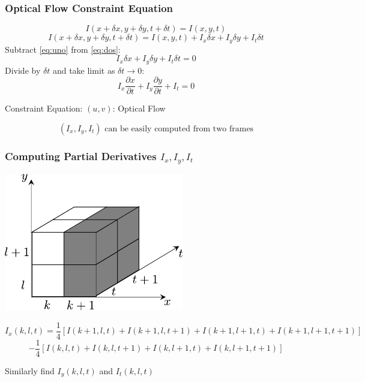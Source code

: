 \begin{frame}
  \frametitle{Optical Flow Constraint Equation}

  \begin{equation}\label{eq:uno}
    I(x + \delta x, y + \delta y, t + \delta t) = I(x, y, t)
  \end{equation}
  \begin{equation}\label{eq:dos}
    I(x + \delta x, y + \delta y, t + \delta t) = I(x, y, t) + I_x \delta x + I_y \delta y + I_t \delta t
  \end{equation}
  Subtract \eqref{eq:uno} from \eqref{eq:dos}: \quad 
  \[
  I_x \delta x + I_y \delta y + I_t \delta t = 0
  \]
  Divide by $\delta t$ and take limit as $\delta t \rightarrow 0$: \quad 
  \[
  I_x \frac{\partial x}{\partial t} + I_y \frac{\partial y}{\partial t} + I_t = 0
  \]

  Constraint Equation: \quad {} \quad $(u,v)$: Optical Flow

  \[
  (I_x, I_y, I_t) \text{ can be easily computed from two frames}
  \]

\end{frame}

\begin{frame}
  \frametitle{Computing Partial Derivatives $I_x, I_y, I_t$}

  \begin{center}
    \includegraphics[width=0.35\columnwidth]{./images/optical_flow/computing_partial_derivatives.pdf}
  \end{center}
  \[
  I_x(k, l, t) = \frac{1}{4} [I(k+1,l,t) + I(k+1,l,t+1) + I(k+1,l+1,t) + I(k+1,l+1,t+1)]
  \]
  \[
  - \frac{1}{4}[I(k,l,t) + I(k,l,t+1) + I(k,l+1,t) + I(k,l+1,t+1)]
  \]

  Similarly find $I_y(k,l,t)$ and $I_t(k,l,t)$

\end{frame}

